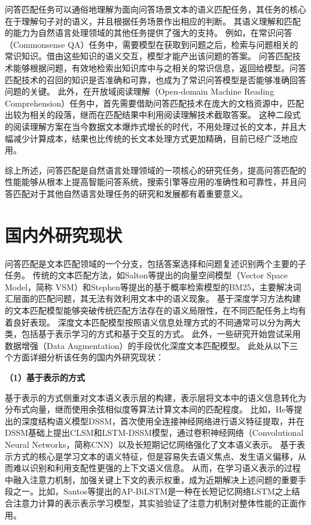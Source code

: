 问答匹配任务可以通俗地理解为面向问答场景文本的语义匹配任务，其任务的核心在于理解句子对的语义，并且根据任务场景作出相应的判断。
其语义理解和匹配的能力为自然语言处理领域的其他任务提供了强大的支持。
例如，在常识问答（Commonsense QA）任务中，需要模型在获取到问题之后，检索与问题相关的常识知识。借由这些知识的语义交互，模型才能产出该问题的答案。
问答匹配技术能够根据问题，有效地检索出知识库中与之相关的常识信息，返回给模型。问答匹配技术的召回的知识是否准确和可靠，也成为了常识问答模型是否能够准确回答问题的关键。
此外，在开放域阅读理解（Open-domain Machine Reading Comprehension）任务中，首先需要借助问答匹配技术在庞大的文档资源中，匹配出较为相关的段落，继而在匹配结果中利用阅读理解技术截取答案。
这种二段式的阅读理解方案在当今数据文本爆炸式增长的时代，不用处理过长的文本，并且大幅减少计算成本，结果也比传统的长文本处理方式更加精确，目前已经广泛地应用。

综上所述，问答匹配是自然语言处理领域的一项核心的研究任务，提高问答匹配的性能能够从根本上提高智能问答系统，搜索引擎等应用的准确性和可靠性，并且问答匹配对于其他自然语言处理任务的研究和发展都有着重要意义。

\section{国内外研究现状}

问答匹配是文本匹配领域的一个分支，包括答案选择和问题复述识别两个主要的子任务。
传统的文本匹配方法，如Salton等提出的向量空间模型（Vector Space Model，简称 VSM）\cite{salton1975vector}和Stephen等提出的基于概率检索模型的BM25\cite{robertson1994some}，主要解决词汇层面的匹配问题，其无法有效利用文本中的语义现象。
基于深度学习方法构建的文本匹配模型能够突破传统匹配方法存在的语义局限性，在不同匹配任务上均有着良好表现。
深度文本匹配模型按照语义信息处理方式的不同通常可以分为两大类，包括基于表示学习的方式和基于交互的方式。
此外，一些研究开始尝试采用数据增强（Data Augmentation）的手段优化深度文本匹配模型。
此处从以下三个方面详细分析该任务的国内外研究现状：

\textbf{\songti （1）基于表示的方式}

基于表示的方式侧重对文本语义表示层的构建，表示层将文本中的语义信息转化为分布式向量，继而使用余弦相似度等算法计算文本间的匹配程度。
比如，He等提出的深度结构语义模型DSSM\cite{huang2013learning}，首次使用全连接神经网络进行语义特征提取，并在DSSM基础上提出CLSM\cite{shen2014latent}和LSTM-DSSM\cite{palangi2014semantic}模型，通过卷积神经网络（Convolutional Neural Networks，简称CNN）\cite{krizhevsky2012imagenet}以及长短期记忆网络强化了文本语义表示。
基于表示方式的核心是学习文本的语义特征，但是容易失去语义焦点、发生语义偏移，从而难以识别和利用支配性更强的上下文语义信息。
从而，在学习语义表示的过程中融入注意力机制，加强关键上下文的表示权重，成为近期解决上述问题的重要手段之一。比如，Santos等提出的AP-BiLSTM\cite{santos2016attentive}是一种在长短记忆网络LSTM之上结合注意力计算的表示表示学习模型，其实验验证了注意力机制对整体性能的正面作用。

